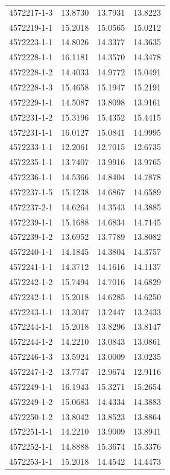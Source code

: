 \begin{longtable}{lrrr}
4572217-1-3 & 13.8730 & 13.7931 & 13.8223 \\
4572219-1-1 & 15.2018 & 15.0565 & 15.0212 \\
4572223-1-1 & 14.8026 & 14.3377 & 14.3635 \\
4572228-1-1 & 16.1181 & 14.3570 & 14.3478 \\
4572228-1-2 & 14.4033 & 14.9772 & 15.0491 \\
4572228-1-3 & 15.4658 & 15.1947 & 15.2191 \\
4572229-1-1 & 14.5087 & 13.8098 & 13.9161 \\
4572231-1-2 & 15.3196 & 15.4352 & 15.4415 \\
4572231-1-1 & 16.0127 & 15.0841 & 14.9995 \\
4572233-1-1 & 12.2061 & 12.7015 & 12.6735 \\
4572235-1-1 & 13.7407 & 13.9916 & 13.9765 \\
4572236-1-1 & 14.5366 & 14.8404 & 14.7878 \\
4572237-1-5 & 15.1238 & 14.6867 & 14.6589 \\
4572237-2-1 & 14.6264 & 14.3543 & 14.3885 \\
4572239-1-1 & 15.1688 & 14.6834 & 14.7145 \\
4572239-1-2 & 13.6952 & 13.7789 & 13.8082 \\
4572240-1-1 & 14.1845 & 14.3804 & 14.3757 \\
4572241-1-1 & 14.3712 & 14.1616 & 14.1137 \\
4572242-1-2 & 15.7494 & 14.7016 & 14.6829 \\
4572242-1-1 & 15.2018 & 14.6285 & 14.6250 \\
4572243-1-1 & 13.3047 & 13.2447 & 13.2433 \\
4572244-1-1 & 15.2018 & 13.8296 & 13.8147 \\
4572244-1-2 & 14.2210 & 13.0843 & 13.0861 \\
4572246-1-3 & 13.5924 & 13.0009 & 13.0235 \\
4572247-1-2 & 13.7747 & 12.9674 & 12.9116 \\
4572249-1-1 & 16.1943 & 15.3271 & 15.2654 \\
4572249-1-2 & 15.0683 & 14.4334 & 14.3883 \\
4572250-1-2 & 13.8042 & 13.8523 & 13.8864 \\
4572251-1-1 & 14.2210 & 13.9009 & 13.8941 \\
4572252-1-1 & 14.8888 & 15.3674 & 15.3376 \\
4572253-1-1 & 15.2018 & 14.4542 & 14.4473 \\

\end{longtable}
